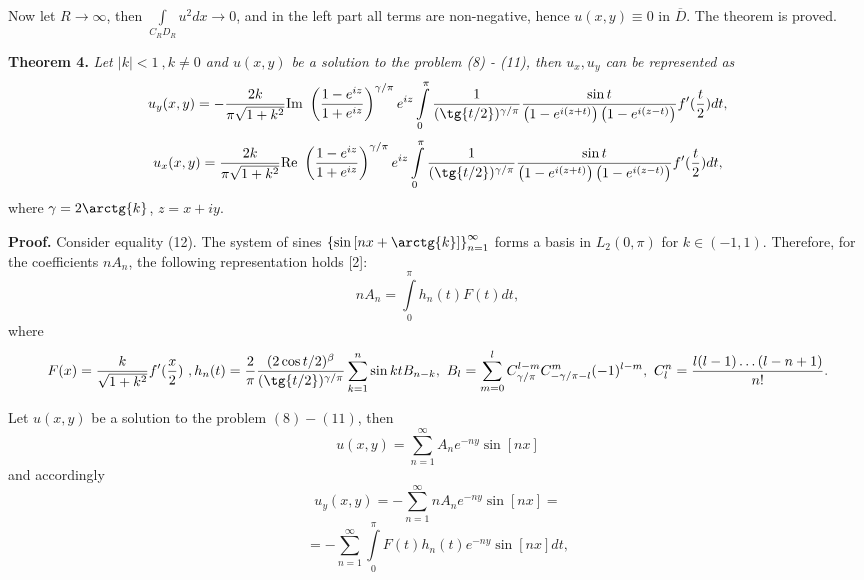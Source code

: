 \documentclass[9pt]{article}
\begin{document}
	Now let $R \to \infty$, then $\int\limits_{C_RD_R} u^2 dx \to 0$, and in the left part all terms are non-negative, hence $u(x,y) \equiv 0$ in $\overline{D}$. The theorem is proved.
	\par
	\textbf{Theorem 4.} \textit{Let $|k| < 1\  , k \neq 0$ and $u(x,y)$ be a solution to the problem (8) - (11), then $u_x, u_y$ can be represented as}
	\begin{equation*}
		u_y(x,y) = -\dfrac{2k}{\pi\sqrt{1+k^2}} \mathrm{Im}\ \left(\dfrac{1- e^{iz}}{1 + e^{iz}} \right)^{\gamma/\pi} e^{iz}\int\limits_0^\pi \dfrac{1}{(\tg{t/2})^{\gamma/\pi}}  \dfrac{ \sin{t}}{\left(1 - e^{i(z+t)} \right) \left(1 - e^{i(z-t)}\right)}  f'(\dfrac{t}{2}) dt,
	\end{equation*}
	\begin{equation*}
		u_x(x,y) = \dfrac{2k}{\pi\sqrt{1+k^2}} \mathrm{Re}\ \left(\dfrac{1- e^{iz}}{1 + e^{iz}} \right)^{\gamma/\pi} e^{iz}\int\limits_0^\pi \dfrac{1}{(\tg{t/2})^{\gamma/\pi}}  \dfrac{ \sin{t}}{\left(1 - e^{i(z+t)} \right) \left(1 - e^{i(z-t)}\right)}  f'(\dfrac{t}{2}) dt,
	\end{equation*}
	where $\gamma = 2\arctg{k}$, $z = x + iy$.
	\par
	\textbf{Proof.} Consider equality (12). The system of sines $\left\{\sin{\left[nx + \arctg{k}\right]}\right\}_{n=1}^{\infty}$ forms a basis in $L_2(0,\pi)$ for $k \in (-1, 1)$. Therefore, for the coefficients $nA_n$, the following representation holds [2]:
	\begin{equation*}
		nA_n = \int\limits_0^\pi h_{n}(t) F(t)dt,
	\end{equation*}
	where
	\begin{equation*}
		F(x) = \dfrac{k}{\sqrt{1+k^2}} f'(\dfrac{x}{2})\ , h_n(t) = \dfrac{2}{\pi}\dfrac{(2\cos{t/2})^\beta}{(\tg{t/2})^{\gamma/\pi}} \sum\limits_{k=1}^n \sin{kt} B_{n-k}, \ B_{l} = \sum\limits_{m=0}^{l} C_{\gamma/\pi}^{l-m} C_{-\gamma / \pi -l}^{m} (-1)^{l-m}, \ C_l^n = \dfrac{l(l-1)\dots (l-n+1)}{n!}.
	\end{equation*}
	\par
	Let $u(x,y)$ be a solution to the problem $(8) - (11)$, then
	\begin{equation*}
		u(x,y) = \sum\limits_{n=1}^{\infty} A_n e^{-ny} \sin{\left[nx\right]}
	\end{equation*}
	and accordingly
	\begin{equation*}
		u_y(x,y) = -\sum\limits_{n=1}^{\infty} nA_n e^{-ny} \sin{\left[nx\right]}=
	\end{equation*}
	\begin{equation*}
		= - \sum\limits_{n=1}^{\infty}  \int\limits_0^\pi F(t)  h_{n}(t)  e^{-ny} \sin{\left[nx\right]} dt,
	\end{equation*}
\end{document}
